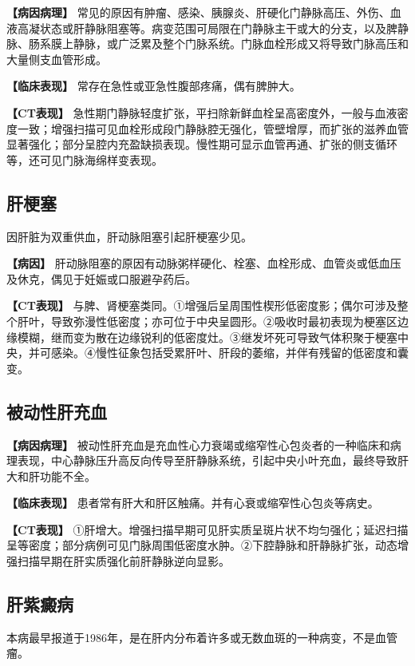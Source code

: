 \textbf{【病因病理】}
常见的原因有肿瘤、感染、胰腺炎、肝硬化门静脉高压、外伤、血液高凝状态或肝静脉阻塞等。病变范围可局限在门静脉主干或大的分支，以及脾静脉、肠系膜上静脉，或广泛累及整个门脉系统。门脉血栓形成又将导致门脉高压和大量侧支血管形成。

\textbf{【临床表现】} 常存在急性或亚急性腹部疼痛，偶有脾肿大。

\textbf{【CT表现】}
急性期门静脉轻度扩张，平扫除新鲜血栓呈高密度外，一般与血液密度一致；增强扫描可见血栓形成段门静脉腔无强化，管壁增厚，而扩张的滋养血管显著强化；部分呈腔内充盈缺损表现。慢性期可显示血管再通、扩张的侧支循环等，还可见门脉海绵样变表现。

\subsection{肝梗塞}

因肝脏为双重供血，肝动脉阻塞引起肝梗塞少见。

\textbf{【病因】}
肝动脉阻塞的原因有动脉粥样硬化、栓塞、血栓形成、血管炎或低血压及休克，偶见于妊娠或口服避孕药后。

\textbf{【CT表现】}
与脾、肾梗塞类同。①增强后呈周围性楔形低密度影；偶尔可涉及整个肝叶，导致弥漫性低密度；亦可位于中央呈圆形。②吸收时最初表现为梗塞区边缘模糊，继而变为散在边缘锐利的低密度灶。③继发坏死可导致气体积聚于梗塞中央，并可感染。④慢性征象包括受累肝叶、肝段的萎缩，并伴有残留的低密度和囊变。

\subsection{被动性肝充血}

\textbf{【病因病理】}
被动性肝充血是充血性心力衰竭或缩窄性心包炎者的一种临床和病理表现，中心静脉压升高反向传导至肝静脉系统，引起中央小叶充血，最终导致肝大和肝功能不全。

\textbf{【临床表现】}
患者常有肝大和肝区触痛。并有心衰或缩窄性心包炎等病史。

\textbf{【CT表现】}
①肝增大。增强扫描早期可见肝实质呈斑片状不均匀强化；延迟扫描呈等密度；部分病例可见门脉周围低密度水肿。②下腔静脉和肝静脉扩张，动态增强扫描早期在肝实质强化前肝静脉逆向显影。

\subsection{肝紫癜病}

本病最早报道于1986年，是在肝内分布着许多或无数血斑的一种病变，不是血管瘤。

